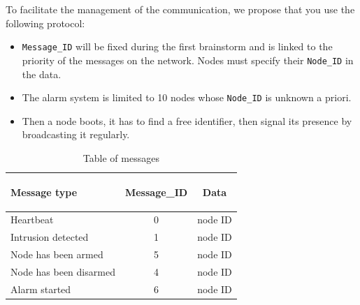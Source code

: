 \documentclass[10pt,a4paper]{article}
\theoremstyle{definition}%
\begin{document}
To facilitate the management of the communication, we propose that you use the following
protocol:
\begin{itemize}
\item \texttt{Message\_ID} will be fixed during the first brainstorm and is linked to the priority of the messages on the network. Nodes must specify their \texttt{Node\_ID} in the data.
\item The alarm system is limited to 10 nodes whose  \texttt{Node\_ID} is unknown a priori.
\item Then a node boots, it has to find a free identifier, then signal its presence by broadcasting
it regularly.
\end{itemize}

\begin{table} [ht]   %
					\begin{center}
						\begin{tabular}{|l|c|c|}
								\hline
								\begin{bf}Message type\end{bf}&\begin{bf}Message\_ID\end{bf}&\begin{bf}Data\end{bf}\\
								\hline
								Heartbeat& 0&node ID\\
								\hline
								Intrusion detected& 1&node ID\\
								\hline
								Node has been armed& 5&node ID\\
								\hline
								Node has been disarmed& 4&node ID\\
								\hline
								Alarm started& 6&node ID\\
								\hline
						\end{tabular}
					\end{center}
					\caption{Table of messages}
					\label{Table of messages}
					\end{table}
\end{document}
